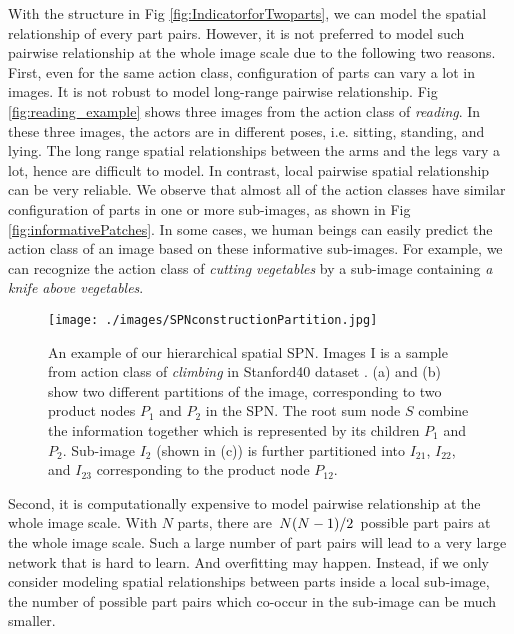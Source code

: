 \documentclass[journal]{IEEEtran}
\begin{document}
With the structure in Fig \ref{fig:IndicatorforTwoparts}, we can model the spatial relationship of every part pairs.
However, it is not preferred to model such pairwise relationship at the whole image scale due to the following two reasons. First, even for the same action class, configuration of parts can vary a lot in images. It is not robust to model long-range pairwise relationship. Fig \ref{fig:reading_example} shows three images from the action class of \textit{reading}. In these three images, the actors are in different poses, i.e. sitting, standing, and lying. The long range spatial relationships between the arms and the legs vary a lot, hence are difficult to model. 
In contrast, local pairwise spatial relationship can be very reliable. We observe that almost all of the action classes have similar configuration of parts in one or more sub-images, as shown in Fig \ref{fig:informativePatches}.  In some cases, we human beings can easily predict the action class of an image based on these informative sub-images. For example, we can recognize the action class of
\textit{cutting vegetables} by a sub-image containing \textit{a knife above vegetables}. 





\begin{figure*}[htb]
	\begin{center}
		\texttt{[image: ./images/SPNconstructionPartition.jpg]}
	\end{center}
	\caption{An example of our hierarchical spatial SPN. Images I is a sample from action class of \textit{climbing} in Stanford40 dataset \cite{Yao11humanaction__Stanford40}. (a) and (b) show two different partitions of the image, corresponding to two product nodes $ P_1 $ and $ P_2 $  in the SPN. The root sum node $ S $ combine the information together which is represented by its children $ P_1 $ and $ P_2 $. Sub-image $ I_2 $ (shown in (c)) is further partitioned into $ I_{21} $, $ I_{22} $, and $ I_{23} $ corresponding to the product node $ P_{12} $.}
	\label{fig:SPNconstructionPartition}
\end{figure*}





Second, it is computationally expensive to model pairwise relationship at the whole image scale.
With $ N $ parts, there are $\left.N(N-1)\middle/2\right. $ possible part pairs at the whole image scale.
Such a large number of part pairs will lead to a very large network that is hard to learn. And overfitting may happen. Instead, if we only consider modeling spatial relationships between parts inside a local sub-image, the number of possible part pairs which co-occur in the sub-image can be much smaller.
\end{document}
